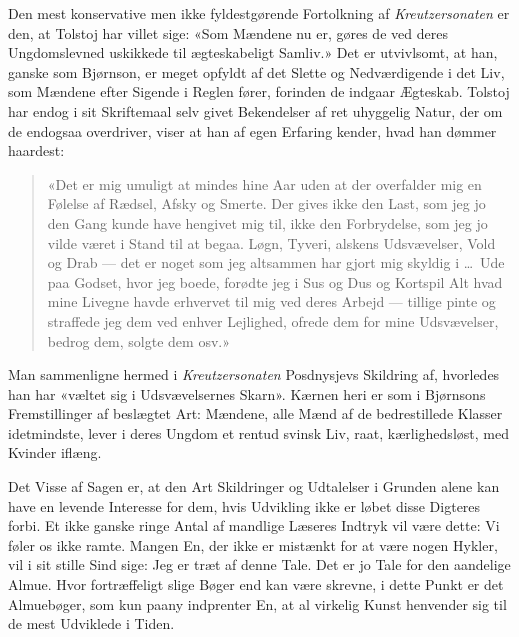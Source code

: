\documentclass[12pt,a4paper]{article}
\begin{document}
Den mest konservative men ikke fyldestgørende Fortolkning af
\textit{Kreutzersonaten} er den, at Tolstoj har villet sige: «Som Mændene
nu er, gøres de ved deres Ungdomslevned uskikkede til ægteskabeligt
Samliv.» Det er utvivlsomt, at han, ganske som Bjørnson, er meget opfyldt
af det Slette og Nedværdigende i det Liv, som Mændene efter Sigende i
Reglen fører, forinden de indgaar Ægteskab. Tolstoj har endog i sit
Skriftemaal selv givet Bekendelser af ret uhyggelig Natur, der om de
endogsaa overdriver, viser at han af egen Erfaring kender, hvad han
dømmer haardest:

\begin{quote}
«Det er mig umuligt at mindes hine Aar uden at der overfalder mig en
Følelse af Rædsel, Afsky og Smerte. Der gives ikke den Last, som jeg jo
den Gang kunde have hengivet mig til, ikke den Forbrydelse, som jeg jo
vilde været i Stand til at begaa. Løgn, Tyveri, alskens Udsvævelser,
Vold og Drab --- det er noget som jeg altsammen har gjort mig skyldig i
\ldots\ Ude paa Godset, hvor jeg boede, forødte jeg i Sus og Dus og
Kortspil Alt hvad mine Livegne havde erhvervet til mig ved deres Arbejd
--- tillige pinte og straffede jeg dem ved enhver Lejlighed, ofrede dem
for mine Udsvævelser, bedrog dem, solgte dem osv.»
\end{quote}

Man sammenligne hermed i \textit{Kreutzersonaten} Posdnysjevs Skildring
af, hvorledes han har «væltet sig i Udsvævelsernes Skarn». Kærnen heri er
som i Bjørnsons Fremstillinger af beslægtet Art: Mændene, alle Mænd af de
bedrestillede Klasser idetmindste, lever i deres Ungdom et rentud svinsk
Liv, raat, kærlighedsløst, med Kvinder iflæng.

Det Visse af Sagen er, at den Art Skildringer og Udtalelser i Grunden
alene kan have en levende Interesse for dem, hvis Udvikling ikke er løbet
disse Digteres forbi. Et ikke ganske ringe Antal af mandlige Læseres
Indtryk vil være dette: Vi føler os ikke ramte. Mangen En, der ikke er
mistænkt for at være nogen Hykler, vil i sit stille Sind sige: Jeg er
træt af denne Tale. Det er jo Tale for den aandelige Almue. Hvor
fortræffeligt slige Bøger end kan være skrevne, i dette Punkt er det
Almuebøger, som kun paany indprenter En, at al virkelig Kunst henvender
sig til de mest Udviklede i Tiden.
\end{document}
